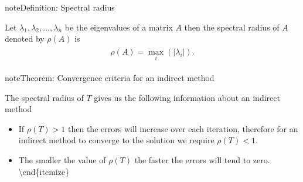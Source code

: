 \documentclass[letterpaper,10pt,english]{jupyterBook}
\begin{document}
\begin{sphinxadmonition}{note}{Definition: Spectral radius}

\sphinxAtStartPar
Let \(\lambda_1, \lambda_2, \ldots, \lambda_n\) be the eigenvalues of a matrix \(A\) then the spectral radius of \(A\) denoted by \(\rho(A)\) is
\begin{equation}\label{equation:7_Indirect_methods/7.3_Convergence_of_indirect_methods:spectral-radius-equation}
\begin{split}\begin{align*}
    \rho(A) = \max_i(|\lambda_i|).
\end{align*}\end{split}
\end{equation}\end{sphinxadmonition}

\begin{sphinxadmonition}{note}{Theorem: Convergence criteria for an indirect method}

\sphinxAtStartPar
The spectral radius of \(T\) gives us the following information about an indirect method
\begin{itemize}
\item {} 
\sphinxAtStartPar
If \(\rho (T) > 1\) then the errors will increase over each iteration, therefore for an indirect method to converge to the solution we require \(\rho (T)< 1\).

\item {} 
\sphinxAtStartPar
The smaller the value of \(\rho (T)\) the faster the errors will tend to zero.
\textbackslash{}end\{itemize\}

\end{itemize}
\end{sphinxadmonition}
\end{document}
